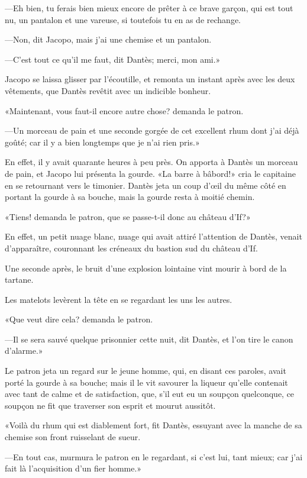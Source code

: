 —Eh bien, tu ferais bien mieux encore de prêter à ce brave garçon, qui est tout nu, un pantalon et une vareuse, si toutefois tu en as de rechange.

—Non, dit Jacopo, mais j'ai une chemise et un pantalon.

—C'est tout ce qu'il me faut, dit Dantès; merci, mon ami.»

Jacopo se laissa glisser par l'écoutille, et remonta un instant après avec les deux vêtements, que Dantès revêtit avec un indicible bonheur.

«Maintenant, vous faut-il encore autre chose? demanda le patron.

—Un morceau de pain et une seconde gorgée de cet excellent rhum dont j'ai déjà goûté; car il y a bien longtemps que je n'ai rien pris.»

En effet, il y avait quarante heures à peu près. On apporta à Dantès un morceau de pain, et Jacopo lui présenta la gourde. «La barre à bâbord!» cria le capitaine en se retournant vers le timonier. Dantès jeta un coup d'œil du même côté en portant la gourde à sa bouche, mais la gourde resta à moitié chemin.

«Tiens! demanda le patron, que se passe-t-il donc au château d'If?»

En effet, un petit nuage blanc, nuage qui avait attiré l'attention de Dantès, venait d'apparaître, couronnant les créneaux du bastion sud du château d'If.

Une seconde après, le bruit d'une explosion lointaine vint mourir à bord de la tartane.

Les matelots levèrent la tête en se regardant les uns les autres.

«Que veut dire cela? demanda le patron.

—Il se sera sauvé quelque prisonnier cette nuit, dit Dantès, et l'on tire le canon d'alarme.»

Le patron jeta un regard sur le jeune homme, qui, en disant ces paroles, avait porté la gourde à sa bouche; mais il le vit savourer la liqueur qu'elle contenait avec tant de calme et de satisfaction, que, s'il eut eu un soupçon quelconque, ce soupçon ne fit que traverser son esprit et mourut aussitôt.

«Voilà du rhum qui est diablement fort, fit Dantès, essuyant avec la manche de sa chemise son front ruisselant de sueur.

—En tout cas, murmura le patron en le regardant, si c'est lui, tant mieux; car j'ai fait là l'acquisition d'un fier homme.»

